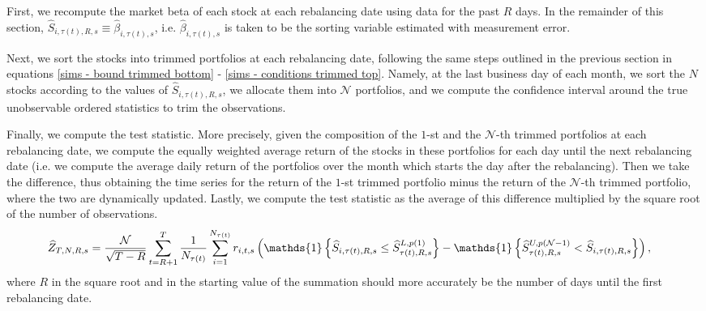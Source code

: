 First, we recompute the market beta of each stock at each rebalancing date using data for the past $R$ days. In the remainder of this section, $\widehat{S}_{i,\tau(t),R,s} \equiv \widehat{\beta}_{i,\tau(t),s}$, i.e. $\widehat{\beta}_{i,\tau(t),s}$ is taken to be the sorting variable estimated with measurement error.  

Next, we sort the stocks into trimmed portfolios at each rebalancing date, following the same steps outlined in the previous section in equations \eqref{sims - bound trimmed bottom} - \eqref{sims - conditions trimmed top}. Namely, at the last business day of each month, we sort the $N$ stocks according to the values of $\widehat{S}_{i,\tau(t),R,s}$, we allocate them into $\mathcal{N}$ portfolios, and we compute the confidence interval around the true unobservable ordered statistics to trim the observations. 

Finally, we compute the test statistic. More precisely, given the composition of the $1$-st and the $\mathcal{N}$-th trimmed portfolios at each rebalancing date, we compute the equally weighted average return of the stocks in these portfolios for each day until the next rebalancing date (i.e. we compute the average daily return of the portfolios over the month which starts the day after the rebalancing). Then we take the difference, thus obtaining the time series for the return of the $1$-st trimmed portfolio minus the return of the $\mathcal{N}$-th trimmed portfolio, where the two are dynamically updated. Lastly, we compute the test statistic as the average of this difference multiplied by the square root of the number of observations.  
\begin{align*}
    \widehat{Z}_{T,N,R,s} &=\frac{\mathcal{N}}{\sqrt{T-R}}\sum_{t=R+1}^{T}\frac{1}{N_{\tau(t)}}\sum_{i=1}^{N_{\tau(t)}}r_{i,t,s}\left( \mathds{1} \left\{ \widehat{S}_{i,\tau(t),R,s}\leq \widehat{S}_{\tau(t),R,s}^{L, p(1)} \right\} - \mathds{1}\left\{  \widehat{S}_{\tau(t),R,s}^{U, p(\mathcal{N}-1)} < \widehat{S}_{i,\tau(t),R,s}\right\} \right), \notag
\end{align*}
where $R$ in the square root and in the starting value of the summation should more accurately be the number of days until the first rebalancing date.

